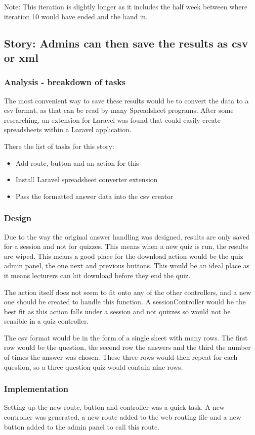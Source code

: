 Note: This iteration is slightly longer as it includes the half week between where iteration 10 would have ended and the hand in.

\subsection{Story: Admins can then save the results as csv or xml}
\subsubsection{Analysis - breakdown of tasks}
The most convenient way to save these results would be to convert the data to a csv format, as that can be read by many Spreadsheet programs. After some researching, an extension for Laravel was found that could easily create spreadsheets within a Laravel application\cite{laravel-excel}.

There the list of tasks for this story:
\begin{itemize}
	\item Add route, button and an action for this
	\item Install Laravel spreadsheet converter extension
	\item Pass the formatted answer data into the csv creator
\end{itemize}
\subsubsection{Design}
Due to the way the original answer handling was designed, results are only saved for a session and not for quizzes. This means when a new quiz is run, the results are wiped. This means a good place for the download action would be the quiz admin panel, the one next and previous buttons. This would be an ideal place as it means lecturers can hit download before they end the quiz.

The action itself does not seem to fit onto any of the other controllers, and a new one should be created to handle this function. A sessionController would be the best fit as this action falls under a session and not quizzes so would not be sensible in a quiz controller.

The csv format would be in the form of a single sheet with many rows. The first row would be the question, the second row the answers and the third the number of times the answer was chosen. These three rows would then repeat for each question, so a three question quiz would contain nine rows.
\subsubsection{Implementation}
Setting up the new route, button and controller was a quick task. A new controller was generated, a new route added to the web routing file and a new button added to the admin panel to call this route.

